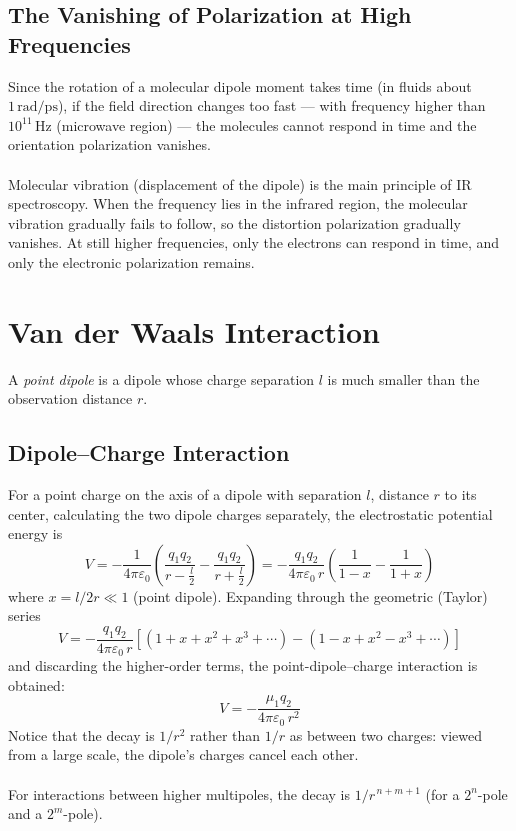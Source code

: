 	\subsection{The Vanishing of Polarization at High Frequencies}

		Since the rotation of a molecular dipole moment takes time (in fluids about $1\,\text{rad/ps}$), if the field direction changes too fast --- with frequency higher than $10^{11}\,\text{Hz}$ (microwave region) --- the molecules cannot respond in time and the orientation polarization vanishes. \\ \\
		Molecular vibration (displacement of the dipole) is the main principle of IR spectroscopy. When the frequency lies in the infrared region, the molecular vibration gradually fails to follow, so the distortion polarization gradually vanishes. 
		At still higher frequencies, only the electrons can respond in time, and only the electronic polarization remains.

\section{Van der Waals Interaction}

	A \emph{point dipole} is a dipole whose charge separation $l$ is much smaller than the observation distance $r$.

	\subsection{Dipole--Charge Interaction}

		For a point charge on the axis of a dipole with separation $l$, distance $r$ to its center, calculating the two dipole charges separately, the electrostatic potential energy is
		\[V = -\frac{1}{4\pi\varepsilon_0}\left(\frac{q_1 q_2}{r-\frac{l}{2}} - \frac{q_1 q_2}{r+\frac{l}{2}}\right)
		= -\frac{q_1 q_2}{4\pi\varepsilon_0\,r}\left(\frac{1}{1-x} - \frac{1}{1+x}\right)\]
		where $x = l/2r \ll 1$ (point dipole). Expanding through the geometric (Taylor) series
		\[V = -\frac{q_1 q_2}{4\pi\varepsilon_0\,r}\left[\left(1+x+x^{2}+x^{3}+\cdots\right) - \left(1-x+x^{2}-x^{3}+\cdots\right)\right]\]
		and discarding the higher-order terms, the point-dipole--charge interaction is obtained:
		\[\boxed{V = -\frac{\mu_1 q_2}{4\pi\varepsilon_0\,r^{2}}}\]
		Notice that the decay is $1/r^{2}$ rather than $1/r$ as between two charges: viewed from a large scale, the dipole's charges cancel each other. \\ \\
		For interactions between higher multipoles, the decay is $1/r^{\,n+m+1}$ (for a $2^n$-pole and a $2^m$-pole).

